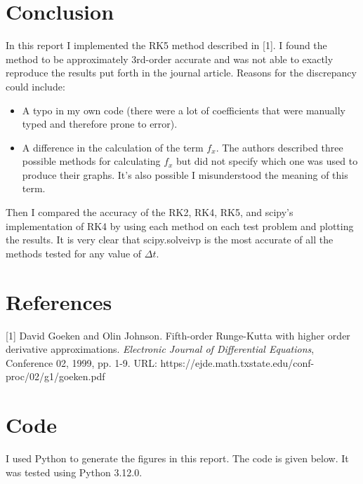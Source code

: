 \documentclass{article}
\begin{document}
\section{Conclusion}
In this report I implemented the RK5 method described in [1].  I found the method to be approximately 3rd-order accurate and was not able to exactly reproduce the results put forth in the journal article.  Reasons for the discrepancy could include:

\begin{itemize}
	\item A typo in my own code (there were a lot of coefficients that were manually typed and therefore prone to error).
	\item  A difference in the calculation of the term $f_x$.  The authors described three possible methods for calculating $f_x$ but did not specify which one was used to produce their graphs.  It's also possible I misunderstood the meaning of this term.
\end{itemize}

Then I compared the accuracy of the RK2, RK4, RK5, and scipy's implementation of RK4 by using each method on each test problem and plotting the results.  It is very clear that scipy.solve\textunderscore ivp is the most accurate of all the methods tested for any value of $\Delta t$.

\section{References}
[1] David Goeken and Olin Johnson. Fifth-order Runge-Kutta with higher order derivative approximations. \textit{Electronic Journal of Differential Equations}, Conference 02, 1999, pp. 1-9. URL:  https://ejde.math.txstate.edu/conf-proc/02/g1/goeken.pdf

\section{Code}
I used Python to generate the figures in this report.  The code is given below.  It was tested using Python 3.12.0.
\end{document}
